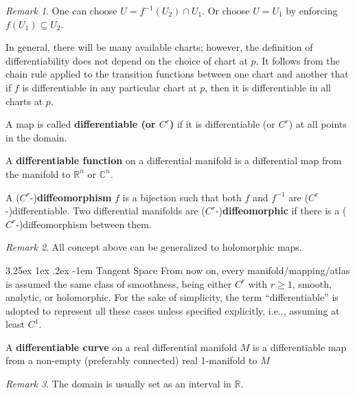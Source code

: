 \documentclass[12pt, letterpaper]{article}
\makeatletter
\newcommand{\re}{\mathbb{R}}
\newcommand{\co}{\mathbb{C}}
\newcommand\ie{i.e\@ifnextchar.{}{.\@}}
\newcommand{\blue}[1]{{\color{blue} #1}}
\renewcommand\paragraph{\@startsection{paragraph}{4}{\z@}%
	{3.25ex \@plus1ex \@minus.2ex}%
	{-1em}%
	{\normalfont\normalsize\bfseries}}
\theoremstyle{definition}
\theoremstyle{remark}
\newtheorem*{rem*}{Remark}
\theoremstyle{definition}
\theoremstyle{plain}
\numberwithin{equation}{section}
\makeatother
\begin{document}
	\begin{rem*}
		One can choose $U=f^{-1}(U_2)\cap U_1$. Or choose $U=U_1$ by enforcing $f(U_1)\subseteq U_2$.
		
		In general, there will be many available charts;
		however, the definition of differentiability does not depend on the choice of chart at $p$.
		It follows from the chain rule applied to the transition functions between one chart and another
		that if $f$ is differentiable in any particular chart at $p$, then it is differentiable in all charts at $p$.
	\end{rem*}
	\begin{def*}
		A map is called \textbf{differentiable (or $C^r$)} if it is differentiable (or $C^r$)
		at all points in the domain.
	\end{def*}
	\begin{def*}
		A \textbf{differentiable function} on a differential manifold is a differential map from the manifold
		to $\re^n$ or $\co^n$.
	\end{def*}

	\begin{def*}[diffeomorphism]
		A ($C^r$-)\textbf{diffeomorphism} $f$ is a bijection such that both $f$ and $f^{-1}$ are 
		($C^r$-)differentiable.
		Two differential manifolds are ($C^r$-)\textbf{diffeomorphic} if there is a ($C^r$-)diffeomorphism between them.
	\end{def*}
	\begin{rem*}
		All concept above can be generalized to holomorphic maps.
	\end{rem*}

	\paragraph{Tangent Space}
	From now on, every manifold/mapping/atlas is assumed the same class of smoothness,
	being either $C^r$ with $r\ge1$, smooth, analytic, or holomorphic.
	For the sake of simplicity, \blue{the term ``differentiable'' %
		is adopted to represent all these cases unless specified explicitly,}
	\ie, assuming at least $C^1$.
	
	\begin{def*}
		A \textbf{differentiable curve} on a real differential manifold $M$
		is a differentiable map from a non-empty (preferably connected) real 1-manifold
		to $M$
	\end{def*}
	\begin{rem*}
		The domain is usually set as an interval in $\re$.
	\end{rem*}
\end{document}
